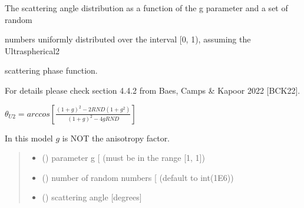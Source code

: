 \documentclass[letterpaper,10pt,english]{sphinxmanual}
\begin{document}

\begin{fulllineitems}
\label{\detokenize{06_anisotropy_factor:skinoptics.anisotropy_factor.theta_U2_from_RND}}
\pysigstartsignatures
{}
\pysigstopsignatures
\begin{DUlineblock}{0em}
\item[] The scattering angle distribution as a function of the g parameter and a set of random
\item[] numbers uniformly distributed over the interval {[}0, 1), assuming the Ultraspherical\sphinxhyphen{}2
\item[] scattering phase function.
\item[] For details please check section 4.4.2 from Baes, Camps \& Kapoor 2022 {[}BCK22{]}.
\end{DUlineblock}

\sphinxAtStartPar
\(\theta_{U2} = arccos\left[\frac{(1 + g)^2 - 2RND(1 + g^2)}{(1 + g)^2 - 4gRND}\right]\)

\begin{DUlineblock}{0em}
\item[] In this model \(g\) is NOT the anisotropy factor.
\end{DUlineblock}
\begin{quote}\begin{description}
\begin{itemize}
\item {} 
\sphinxAtStartPar
{} () \textendash{} parameter g {[}\sphinxhyphen{}{]} (must be in the range {[}\sphinxhyphen{}1, 1{]})

\item {} 
\sphinxAtStartPar
{} () \textendash{} number of random numbers {[}\sphinxhyphen{}{]} (default to int(1E6))

\end{itemize}

\sphinxAtStartPar
\begin{itemize}
\item {} 
\sphinxAtStartPar
{} () \textendash{} scattering angle {[}degrees{]}

\end{itemize}


\end{description}\end{quote}

\end{fulllineitems}
\end{document}
